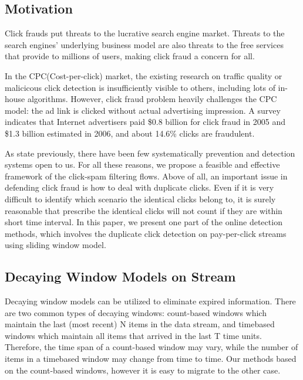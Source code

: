 \documentclass[runningheads,report]{llncs}
\begin{document}
\subsection{Motivation}

Click frauds put threats to the lucrative search engine market. Threats to the search engines' underlying business model are also threats to the free services that provide to millions of users, making click fraud a concern for all\cite{DBLP:journals/computer/Jansen08}. 

In the CPC(Cost-per-click) market, the existing research on traffic quality or malicicous click detection is insufficiently visible to others, including lots of in-house algorithms.  However, click fraud problem heavily challenges the CPC model: the ad link is clicked without actual advertising impression. A survey indicates that Internet advertisers paid \$0.8 billion for click fraud in 2005 and \$1.3 billion estimated in 2006, and about 14.6\% clicks are fraudulent\cite{website:HotTopics}.

As state previously, there have been few systematically prevention and detection systems open to us. For all these reasons, we propose a feasible and effective framework of the click-spam filtering flows. Above of all, an important issue in defending click fraud is how to deal with duplicate clicks. Even if it is very difficult to identify which scenario the identical clicks belong to, it is surely reasonable that prescribe the identical clicks will not count if they are within short time interval. In this paper, we present one part of the online detection methods, which involves the duplicate click detection on pay-per-click streams using sliding window model.


\subsection{{Decaying Window Models on Stream}}

Decaying window models can be utilized to eliminate expired information. There are two common types of decaying windows: count-based windows which maintain the last (most recent) N items in the data stream, and timebased windows which maintain all items that arrived in the last T time units. Therefore, the time span of a count-based window may vary, while the number of items in a timebased window may change from time to time\cite{DBLP:conf/icdcs/ZhangG08}. Our methods based on the count-based windows, however it is easy to migrate to the other case.
\end{document}
